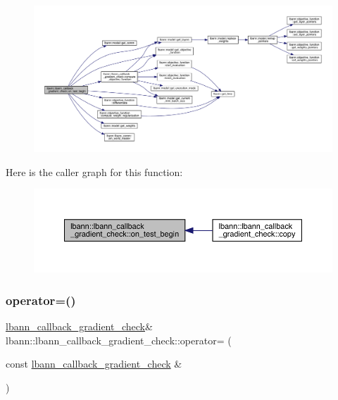 \begin{figure}[H]
\begin{center}
\leavevmode
\includegraphics[width=350pt]{classlbann_1_1lbann__callback__gradient__check_ab62102d5ab30330386514161b9ee6586_cgraph}
\end{center}
\end{figure}
Here is the caller graph for this function\+:\nopagebreak
\begin{figure}[H]
\begin{center}
\leavevmode
\includegraphics[width=350pt]{classlbann_1_1lbann__callback__gradient__check_ab62102d5ab30330386514161b9ee6586_icgraph}
\end{center}
\end{figure}
\mbox{\label{classlbann_1_1lbann__callback__gradient__check_a937cc9192005451b8e059b935533cecc}} 
\subsubsection{\texorpdfstring{operator=()}{operator=()}}
{\footnotesize\ttfamily \hyperlink{classlbann_1_1lbann__callback__gradient__check}{lbann\+\_\+callback\+\_\+gradient\+\_\+check}\& lbann\+::lbann\+\_\+callback\+\_\+gradient\+\_\+check\+::operator= (\begin{DoxyParamCaption}\item[{const \hyperlink{classlbann_1_1lbann__callback__gradient__check}{lbann\+\_\+callback\+\_\+gradient\+\_\+check} \&}]{ }\end{DoxyParamCaption})\hspace{0.3cm}{\ttfamily [default]}}



